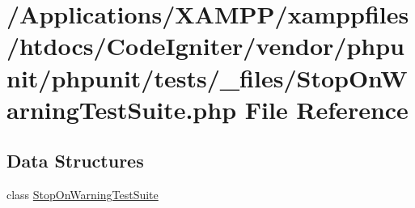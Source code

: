 \hypertarget{_stop_on_warning_test_suite_8php}{}\section{/\+Applications/\+X\+A\+M\+P\+P/xamppfiles/htdocs/\+Code\+Igniter/vendor/phpunit/phpunit/tests/\+\_\+files/\+Stop\+On\+Warning\+Test\+Suite.php File Reference}
\label{_stop_on_warning_test_suite_8php}
\subsection*{Data Structures}
\begin{DoxyCompactItemize}
\item 
class \mbox{\hyperlink{class_stop_on_warning_test_suite}{Stop\+On\+Warning\+Test\+Suite}}
\end{DoxyCompactItemize}
